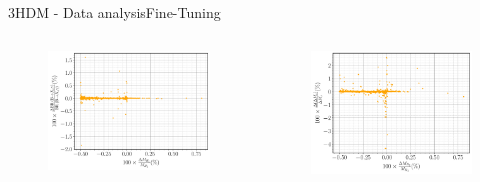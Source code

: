 \documentclass[10pt,xcolor=dvipsnames,mathserif]{beamer}
\begin{document}
\begin{frame}{3HDM - Data analysis}{Fine-Tuning}
\begin{columns}
    \begin{column}{0.48\textwidth}
    \begin{figure}[htb!]
    \centering
    \includegraphics[width=.8\textwidth]{Images/3HDM/Fine_Tuning/Xsgamma_H1.pdf}
    \end{figure}	
    \end{column}
    \begin{column}{0.48\textwidth}
    \begin{figure}[htb!]
    \centering
    \includegraphics[width=.8\textwidth]{Images/3HDM/Fine_Tuning/DeltaMs_H1.pdf}
    \end{figure}	
    \end{column}
    
\end{columns} 

\begin{columns}
    

\end{columns}
\end{frame}
\end{document}
